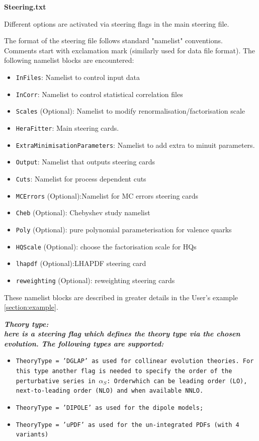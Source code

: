 \begin{description}
\item \bf{Steering.txt}\rm 

Different options are activated via steering flags in the main steering file.
 
The format of the steering file follows standard "namelist" conventions.
Comments start with exclamation mark (similarly used for data file format).
The following namelist blocks are encountered:
\begin{itemize}
\item  {\tt InFiles}: Namelist to control input data
\item  {\tt InCorr}: Namelist to control statistical correlation files
\item  {\tt Scales} (Optional): Namelist to modify renormalisation/factorisation scale
\item  {\tt HeraFitter}: Main steering cards. 
\item  {\tt ExtraMinimisationParameters}:  Namelist to add extra to minuit parameters.
\item  {\tt Output}: Namelist that outputs steering cards 
\item  {\tt Cuts}: Namelist for process dependent cuts
\item  {\tt MCErrors} (Optional):Namelist for MC errors steering cards
\item  {\tt Cheb} (Optional): Chebyshev study namelist
\item  {\tt Poly} (Optional): pure polynomial parameterisation for valence quarks
\item  {\tt HQScale} (Optional): choose the factorisation scale for HQs
\item  {\tt lhapdf} (Optional):LHAPDF steering card
\item  {\tt reweighting} (Optional): reweighting steering cards
\end{itemize}

These namelist blocks are described in greater details in the User's example \ref{section:example}. 


\begin{description}
\item \it\bf Theory type: \rm\\
 
here is a steering flag which defines the theory type via the chosen evolution.
The following types are supported:
\begin{itemize}
\item \tt{TheoryType = 'DGLAP' }\rm as used for collinear evolution theories. For this type another 
 flag is needed to specify the order of the perturbative series in $\alpha_S$:
\tt{Order}\rm which can be leading order (LO), next-to-leading order (NLO) and when available NNLO.
\item \tt{TheoryType = 'DIPOLE' }\rm as used for the dipole models;
\item \tt{TheoryType = 'uPDF' }\rm as used for the un-integrated PDFs (with 4 variants)
\end{itemize}


\end{description}
\end{description}
